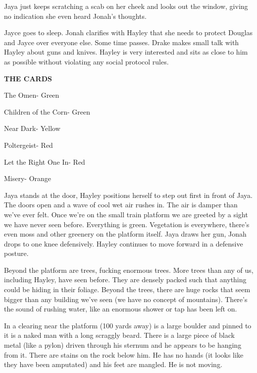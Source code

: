 Jaya just keeps scratching a scab on her cheek and looks out the window, giving no indication she even heard Jonah's thoughts.  


Jayce goes to sleep.  Jonah clarifies with Hayley that she needs to protect Douglas and Jayce over everyone else.  Some time passes.  Drake makes small talk with Hayley about guns and knives.  Hayley is very interested and sits as close to him as possible without violating any social protocol rules.





\textbf{THE CARDS }

{\parskip=0pt
The Omen- Green

Children of the Corn- Green

Near Dark- Yellow

Poltergeist- Red

Let the Right One In- Red

Misery- Orange
}


Jaya stands at the door, Hayley positions herself to step out first in front of Jaya.  The doors open and a wave of cool wet air rushes in.  The air is damper than we've ever felt.  Once we're on the small train platform we are greeted by a sight we have never seen before.  Everything is green.  Vegetation is everywhere, there's even moss and other greenery on the platform itself.  Jaya draws her gun, Jonah drops to one knee defensively.  Hayley continues to move forward in a defensive posture.



Beyond the platform are trees, fucking enormous trees.  More trees than any of us, including Hayley, have seen before.  They are densely packed such that anything could be hiding in their foliage.  Beyond the trees, there are huge rocks that seem bigger than any building we've seen (we have no concept of mountains).  There's the sound of rushing water, like an enormous shower or tap has been left on.  



In a clearing near the platform (100 yards away) is a large boulder and pinned to it is a naked man with a long scraggly beard.  There is a large piece of black metal (like a pylon) driven through his sternum and he appears to be hanging from it. There are stains on the rock below him.  He has no hands (it looks like they have been amputated) and his feet are mangled.  He is not moving.



